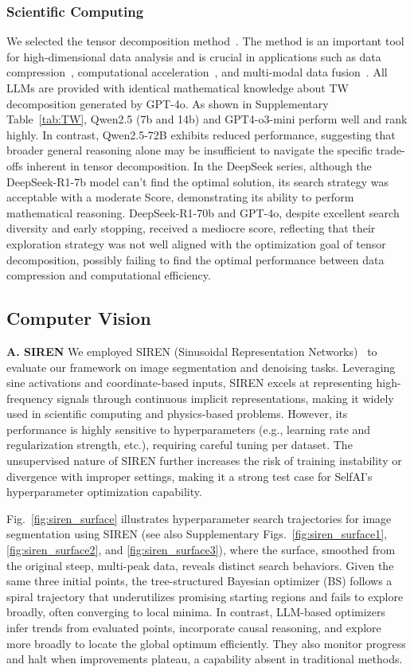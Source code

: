 \subsubsection{Scientific Computing}
We selected the tensor decomposition method~\cite{tw}. The method is an important tool for high-dimensional data analysis and is crucial in applications such as data compression~\cite{li2025lossless}, computational acceleration~\cite{berezutskii2025tensor}, and multi-modal data fusion~\cite{steyaert2023multimodal}. All LLMs are provided with identical mathematical knowledge about TW decomposition generated by GPT-4o. As shown in Supplementary Table~\ref{tab:TW}, Qwen2.5 (7b and 14b) and GPT4-o3-mini perform well and rank highly. In contrast, Qwen2.5-72B exhibits reduced performance, suggesting that broader general reasoning alone may be insufficient to navigate the specific trade-offs inherent in tensor decomposition. In the DeepSeek series, although the DeepSeek-R1-7b model can't find the optimal solution, its search strategy was acceptable with a moderate Score, demonstrating its ability to perform mathematical reasoning. DeepSeek-R1-70b and GPT-4o, despite excellent search diversity and early stopping, received a mediocre score, reflecting that their exploration strategy was not well aligned with the optimization goal of tensor decomposition, possibly failing to find the optimal performance between data compression and computational efficiency.

\subsection{Computer Vision}
{\noindent\bf A. SIREN} We employed SIREN (Sinusoidal Representation Networks)~\citep{sitzmann2020implicit} to evaluate our framework on image segmentation and denoising tasks. Leveraging sine activations and coordinate-based inputs, SIREN excels at representing high-frequency signals through continuous implicit representations, making it widely used in scientific computing and physics-based problems. However, its performance is highly sensitive to hyperparameters (e.g., learning rate and regularization strength, etc.), requiring careful tuning per dataset. The unsupervised nature of SIREN further increases the risk of training instability or divergence with improper settings, making it a strong test case for SelfAI's hyperparameter optimization capability. 

Fig.~\ref{fig:siren_surface} illustrates hyperparameter search trajectories for image segmentation using SIREN (see also Supplementary Figs.~\ref{fig:siren_surface1}, \ref{fig:siren_surface2}, and \ref{fig:siren_surface3}), where the surface, smoothed from the original steep, multi-peak data, reveals distinct search behaviors. Given the same three initial points, the tree-structured Bayesian optimizer (BS) follows a spiral trajectory that underutilizes promising starting regions and fails to explore broadly, often converging to local minima. In contrast, LLM-based optimizers infer trends from evaluated points, incorporate causal reasoning, and explore more broadly to locate the global optimum efficiently. They also monitor progress and halt when improvements plateau, a capability absent in traditional methods.

